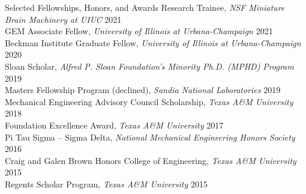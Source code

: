 \documentclass[11pt]{resume} %
\begin{document}
\begin{rSection}{Selected Fellowships, Honors, and Awards}
    \setlength\itemsep{0em}
    Research Trainee, \textit{NSF Miniature Brain Machinery at UIUC} \hfill 2021\\
    GEM Associate Fellow, \textit{University of Illinois at Urbana-Champaign} \hfill 2021\\
    Beckman Institute Graduate Fellow, \textit{University of Illinois at Urbana-Champaign} \hfill 2020\\
    Sloan Scholar, \textit{Alfred P. Sloan Foundation's Minority Ph.D. (MPHD) Program} \hfill 2019\\
    Masters Fellowship Program (declined), \textit{Sandia National Laboratories} \hfill 2019\\
    Mechanical Engineering Advisory Council Scholarship, \textit{Texas A\&M University} \hfill 2018\\
    Foundation Excellence Award, \textit{Texas A\&M University} \hfill 2017\\
    Pi Tau Sigma -- Sigma Delta, \textit{National Mechanical Engineering Honors Society} \hfill 2016\\
    Craig and Galen Brown Honors College of Engineering, \textit{Texas A\&M University} \hfill 2015\\
    Regents Scholar Program, \textit{Texas A\&M University} \hfill 2015
\end{rSection}

\end{document}
